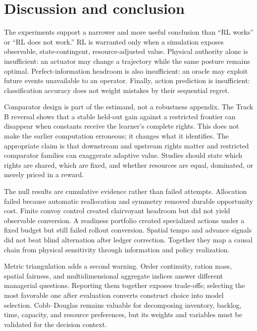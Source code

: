 \section{Discussion and conclusion}\label{sec:discussion}

The experiments support a narrower and more useful conclusion than ``RL works'' or ``RL does
not work.'' RL is warranted only when a simulation exposes observable, state-contingent,
resource-adjusted value. Physical authority alone is insufficient: an actuator may change a
trajectory while the same posture remains optimal. Perfect-information headroom is also
insufficient: an oracle may exploit future events unavailable to an operator. Finally, action
prediction is insufficient: classification accuracy does not weight mistakes by their
sequential regret.

Comparator design is part of the estimand, not a robustness appendix. The Track B reversal
shows that a stable held-out gain against a restricted frontier can disappear when constants
receive the learner's complete rights. This does not make the earlier computation erroneous;
it changes what it identifies. The appropriate claim is that downstream and upstream rights
matter and restricted comparator families can exaggerate adaptive value. Studies should state
which rights are shared, which are fixed, and whether resources are equal, dominated, or merely
priced in a reward.

The null results are cumulative evidence rather than failed attempts. Allocation failed because
automatic reallocation and symmetry removed durable opportunity cost. Finite convoy control
created clairvoyant headroom but did not yield observable conversion. A readiness portfolio
created specialized actions under a fixed budget but still failed rollout conversion. Spatial
tempo and advance signals did not beat blind alternation after ledger correction. Together they
map a causal chain from physical sensitivity through information and policy realization.

Metric triangulation adds a second warning. Order continuity, ration mass, spatial fairness,
and multidimensional aggregate indices answer different managerial questions. Reporting them
together exposes trade-offs; selecting the most favorable one after evaluation converts
construct choice into model selection. Cobb--Douglas remains valuable for decomposing
inventory, backlog, time, capacity, and resource preferences, but its weights and variables
must be validated for the decision context.

